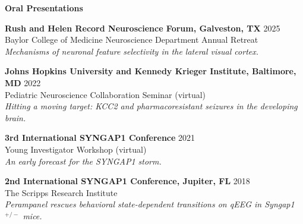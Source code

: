 \documentclass{resume} %
\begin{document}
\begin{rSection}{{\bfseries Oral Presentations}}

    {\bfseries Rush and Helen Record Neuroscience Forum, Galveston, TX} \hfill {2025}
\\ Baylor College of Medicine Neuroscience Department Annual Retreat
\\ \emph{Mechanisms of neuronal feature selectivity in the lateral visual cortex.} \vspace{0.3\baselineskip}

    {\bfseries Johns Hopkins University and Kennedy Krieger Institute, Baltimore, MD} \hfill {2022}
\\ Pediatric Neuroscience Collaboration Seminar (virtual)
\\ \emph{Hitting a moving target: KCC2 and pharmacoresistant seizures in the developing brain.} \vspace{0.3\baselineskip}

    {\bfseries 3rd International SYNGAP1 Conference} \hfill {2021}
\\ Young Investigator Workshop (virtual)
\\ \emph{An early forecast for the SYNGAP1 storm.} \vspace{0.3\baselineskip}

    {\bfseries 2nd International SYNGAP1 Conference, Jupiter, FL} \hfill {2018}
\\ The Scripps Research Institute
\\ \emph{Perampanel rescues behavioral state-dependent transitions on qEEG in Syngap1$^{+/-}$ mice.}

\end{rSection}
\end{document}
